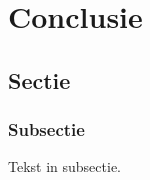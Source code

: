 \chapter{Conclusie} \label{hoofdstuk:conclusie}
\section{Sectie}
\subsection{Subsectie}
Tekst in subsectie.